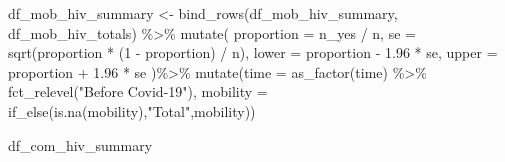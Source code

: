 \documentclass[
  letterpaper,
  DIV=11,
  numbers=noendperiod]{scrartcl}
\newenvironment{Shaded}{\begin{snugshade}}{\end{snugshade}}
\newcommand{\AttributeTok}[1]{\textcolor[rgb]{0.40,0.45,0.13}{#1}}
\newcommand{\DecValTok}[1]{\textcolor[rgb]{0.68,0.00,0.00}{#1}}
\newcommand{\FloatTok}[1]{\textcolor[rgb]{0.68,0.00,0.00}{#1}}
\newcommand{\FunctionTok}[1]{\textcolor[rgb]{0.28,0.35,0.67}{#1}}
\newcommand{\NormalTok}[1]{\textcolor[rgb]{0.00,0.23,0.31}{#1}}
\newcommand{\OtherTok}[1]{\textcolor[rgb]{0.00,0.23,0.31}{#1}}
\newcommand{\SpecialCharTok}[1]{\textcolor[rgb]{0.37,0.37,0.37}{#1}}
\newcommand{\StringTok}[1]{\textcolor[rgb]{0.13,0.47,0.30}{#1}}
\begin{document}
\begin{Shaded}
\begin{Highlighting}[]
\NormalTok{df\_mob\_hiv\_summary }\OtherTok{\textless{}{-}} \FunctionTok{bind\_rows}\NormalTok{(df\_mob\_hiv\_summary, df\_mob\_hiv\_totals) }\SpecialCharTok{\%\textgreater{}\%}
  \FunctionTok{mutate}\NormalTok{(}
    \AttributeTok{proportion =}\NormalTok{ n\_yes }\SpecialCharTok{/}\NormalTok{ n,}
    \AttributeTok{se =} \FunctionTok{sqrt}\NormalTok{(proportion }\SpecialCharTok{*}\NormalTok{ (}\DecValTok{1} \SpecialCharTok{{-}}\NormalTok{ proportion) }\SpecialCharTok{/}\NormalTok{ n),}
    \AttributeTok{lower =}\NormalTok{ proportion }\SpecialCharTok{{-}} \FloatTok{1.96} \SpecialCharTok{*}\NormalTok{ se,}
    \AttributeTok{upper =}\NormalTok{ proportion }\SpecialCharTok{+} \FloatTok{1.96} \SpecialCharTok{*}\NormalTok{ se}
\NormalTok{  )}\SpecialCharTok{\%\textgreater{}\%} 
  \FunctionTok{mutate}\NormalTok{(}\AttributeTok{time =} \FunctionTok{as\_factor}\NormalTok{(time) }\SpecialCharTok{\%\textgreater{}\%} 
           \FunctionTok{fct\_relevel}\NormalTok{(}\StringTok{"Before Covid{-}19"}\NormalTok{),}
         \AttributeTok{mobility =} \FunctionTok{if\_else}\NormalTok{(}\FunctionTok{is.na}\NormalTok{(mobility),}\StringTok{"Total"}\NormalTok{,mobility))}



\NormalTok{df\_com\_hiv\_summary}
\end{Highlighting}
\end{Shaded}
\end{document}
